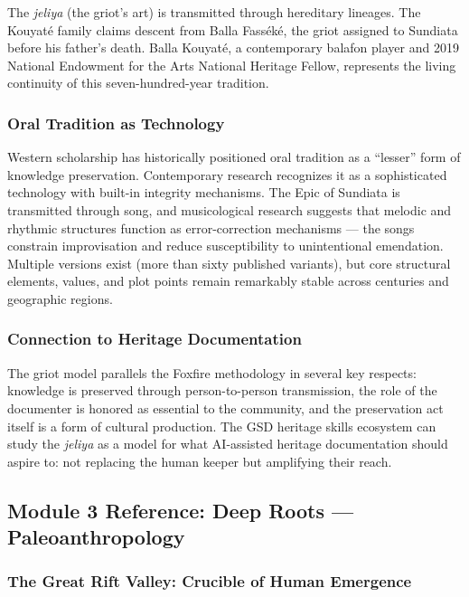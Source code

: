 \documentclass[11pt,letterpaper]{article}
\begin{document}
The \textit{jeliya} (the griot's art) is transmitted through hereditary lineages. The Kouyat\'{e} family claims descent from Balla Fass\'{e}k\'{e}, the griot assigned to Sundiata before his father's death. Balla Kouyat\'{e}, a contemporary balafon player and 2019 National Endowment for the Arts National Heritage Fellow, represents the living continuity of this seven-hundred-year tradition.

\subsubsection{Oral Tradition as Technology}

Western scholarship has historically positioned oral tradition as a ``lesser'' form of knowledge preservation. Contemporary research recognizes it as a sophisticated technology with built-in integrity mechanisms. The Epic of Sundiata is transmitted through song, and musicological research suggests that melodic and rhythmic structures function as error-correction mechanisms --- the songs constrain improvisation and reduce susceptibility to unintentional emendation. Multiple versions exist (more than sixty published variants), but core structural elements, values, and plot points remain remarkably stable across centuries and geographic regions.

\subsubsection{Connection to Heritage Documentation}

The griot model parallels the Foxfire methodology in several key respects: knowledge is preserved through person-to-person transmission, the role of the documenter is honored as essential to the community, and the preservation act itself is a form of cultural production. The GSD heritage skills ecosystem can study the \textit{jeliya} as a model for what AI-assisted heritage documentation should aspire to: not replacing the human keeper but amplifying their reach.

\subsection{Module 3 Reference: Deep Roots --- Paleoanthropology}

\subsubsection{The Great Rift Valley: Crucible of Human Emergence}
\end{document}
